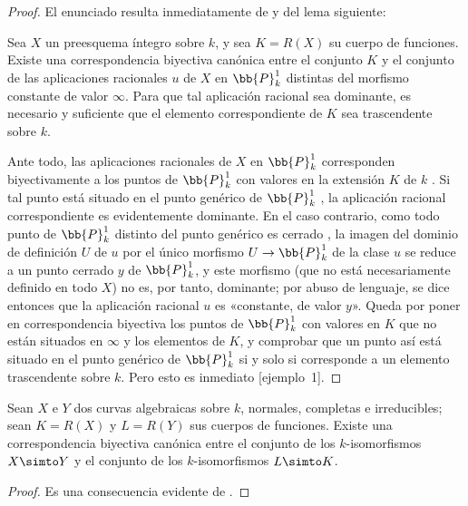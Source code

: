 \documentclass[oneside,10pt]{amsart}
\makeatletter
\newcommand{\ega@arrow}[2]{\mathchoice{#1}{#2}{#2}{#2}}
\renewcommand{\to}{\ega@arrow{\longrightarrow}{\rightarrow}}
\newcommand{\oldpage}[2][]{\marginnote{\normalfont\footnotesize\textbf{#1}~|~#2}\ignorespaces}
\let\EGAOriginalLabel\label
\renewcommand{\label}[1]{\phantomsection\EGAOriginalLabel{#1}}
\makeatother
\begin{document}
\begin{proof}
El enunciado resulta inmediatamente de  y del lema siguiente:
\begin{lemma}[7.4.15.1]
\label{II.7.4.15.1}
Sea $X$ un preesquema íntegro sobre $k$, y sea $K=R(X)$ su cuerpo de funciones.
Existe una correspondencia biyectiva canónica entre el conjunto $K$ y el conjunto de las aplicaciones racionales $u$ de $X$ en $\bb{P}_k^1$ distintas del morfismo constante de valor $\infty$.
Para que tal aplicación racional sea dominante, es necesario y suficiente que el elemento correspondiente de $K$ sea trascendente sobre $k$.
\end{lemma}
Ante todo, las aplicaciones racionales de $X$ en $\bb{P}_k^1$ corresponden biyectivamente a los puntos de $\bb{P}_k^1$ con valores en la extensión $K$ de $k$ .
Si tal punto está situado en el punto genérico de $\bb{P}_k^1$ , la aplicación racional correspondiente es evidentemente dominante.
En el caso contrario, como todo punto de $\bb{P}_k^1$ distinto del punto genérico es cerrado , la imagen del dominio de definición $U$ de $u$ por el único morfismo $U\to\bb{P}_k^1$ de la clase $u$  se reduce a un punto cerrado $y$ de $\bb{P}_k^1$, y este morfismo (que no está necesariamente definido en todo $X$) no es, por tanto, dominante;
por abuso de lenguaje, se dice entonces que la aplicación racional $u$ es «constante, de valor $y$».
Queda por poner en correspondencia biyectiva los puntos de $\bb{P}_k^1$ con valores en $K$ que no están situados en $\infty$  y los elementos de $K$, y comprobar que un punto así está situado en el punto genérico de $\bb{P}_k^1$ si y solo si corresponde a un
\oldpage[II]{152}
elemento trascendente sobre $k$.
Pero esto es inmediato [ejemplo~1].
\end{proof}

\begin{corollary}[7.4.16]
\label{II.7.4.16}
Sean $X$ e $Y$ dos curvas algebraicas sobre $k$, \textup{normales, completas} e irreducibles;
sean $K=R(X)$ y $L=R(Y)$ sus cuerpos de funciones.
Existe una correspondencia biyectiva canónica entre el conjunto de los $k$-isomorfismos $X\simto Y$ y el conjunto de los $k$-isomorfismos $L\simto K$.
\end{corollary}

\begin{proof}
Es una consecuencia evidente de .
\end{proof}
\end{document}
